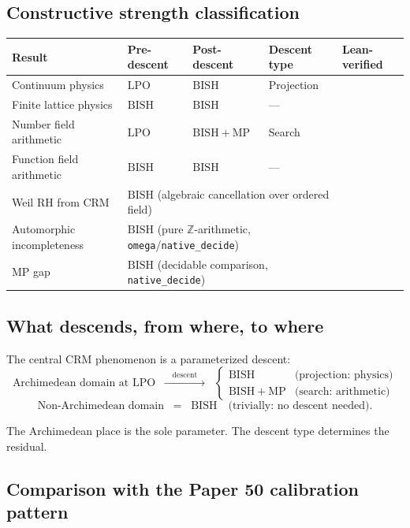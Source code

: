 \documentclass[11pt]{article}
\theoremstyle{definition}
\theoremstyle{remark}
\newcommand{\leanok}{\textsf{\small \textcolor{green!70!black}{\checkmark}}}
\newcommand{\Z}{\mathbb{Z}}
\newcommand{\BISH}{\mathrm{BISH}}
\newcommand{\LPO}{\mathrm{LPO}}
\newcommand{\MP}{\mathrm{MP}}
\newcommand{\CRM}{\mathrm{CRM}}
\begin{document}
\subsection{Constructive strength classification}

\begin{center}
\begin{tabular}{lllll}
\toprule
\textbf{Result} & \textbf{Pre-descent} & \textbf{Post-descent} & \textbf{Descent type} & \textbf{Lean-verified} \\
\midrule
Continuum physics & $\LPO$ & $\BISH$ & Projection & \leanok \\
Finite lattice physics & $\BISH$ & $\BISH$ & --- & \leanok \\
Number field arithmetic & $\LPO$ & $\BISH + \MP$ & Search & \leanok \\
Function field arithmetic & $\BISH$ & $\BISH$ & --- & \leanok \\
\midrule
Weil RH from CRM & \multicolumn{3}{l}{$\BISH$ (algebraic cancellation over ordered field)} & \leanok \\
Automorphic incompleteness & \multicolumn{3}{l}{$\BISH$ (pure $\Z$-arithmetic, \texttt{omega}/\texttt{native\_decide})} & \leanok \\
MP gap & \multicolumn{3}{l}{$\BISH$ (decidable comparison, \texttt{native\_decide})} & \leanok \\
\bottomrule
\end{tabular}
\end{center}

\subsection{What descends, from where, to where}

The central $\CRM$ phenomenon is a parameterized descent:
\[
\text{Archimedean domain at } \LPO \;\;\xrightarrow{\quad\text{descent}\quad}\;\; \begin{cases} \BISH & \text{(projection: physics)} \\ \BISH + \MP & \text{(search: arithmetic)} \end{cases}
\]
\[
\text{Non-Archimedean domain} \;\;=\;\; \BISH \quad \text{(trivially: no descent needed)}.
\]

The Archimedean place is the sole parameter. The descent type determines the residual.

\subsection{Comparison with the Paper 50 calibration pattern}
\end{document}
